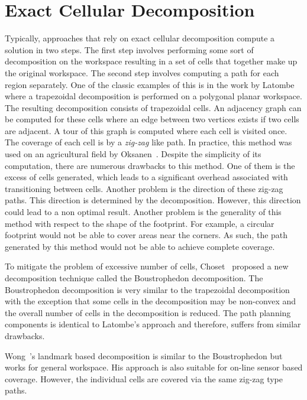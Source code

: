 \documentclass[../main.tex]{subfiles}
\begin{document}
\section{Exact Cellular Decomposition}
\label{section:exact_cellular_decomposition}

Typically, approaches that rely on exact cellular decomposition compute a solution in two steps. The first step involves performing some sort of decomposition on the workspace resulting in a set of cells that together make up the original workspace. The second step involves computing a path for each region separately. One of the classic examples of this is in the work by Latombe~\cite{latombe1991exact} where a trapezoidal decomposition is performed on a polygonal planar workspace. The resulting decomposition consists of trapezoidal cells. An adjacency graph can be computed for these cells where an edge between two vertices exists if two cells are adjacent. A tour of this graph is computed where each cell is visited once. The coverage of each cell is by a \emph{zig-zag} like path.  In practice, this method was used on an agricultural field by Oksanen~\cite{Oksanen2009coverage}. Despite the simplicity of its computation, there are numerous drawbacks to this method. One of them is the excess of cells generated, which leads to a significant overhead associated with transitioning between cells. Another problem is the direction of these zig-zag paths. This direction is determined by the decomposition. However, this direction could lead to a non optimal result. Another problem is the generality of this method with respect to the shape of the footprint. For example, a circular footprint would not be able to cover areas near the corners. As such, the path generated by this method would not be able to achieve complete coverage.

To mitigate the problem of excessive number of cells, Choset~\cite{choset2000coverage} proposed a new decomposition technique called the Boustrophedon decomposition. The Boustrophedon decomposition is very similar to the trapezoidal decomposition with the exception that some cells in the decomposition may be non-convex and the overall number of cells in the decomposition is reduced. The path planning components is identical to Latombe's approach and therefore, suffers from similar drawbacks.

Wong~\cite{wong2004complete}'s landmark based decomposition is similar to the Boustrophedon but works for general workspace. His approach is also suitable for on-line sensor based coverage. However, the individual cells are covered via the same zig-zag type paths.
\end{document}

